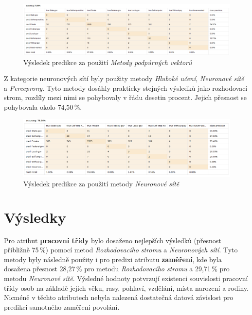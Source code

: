 \documentclass[11pt,a4paper,titlepage]{article}
\begin{document}
            \begin{figure}[H]
                \centering
                \includegraphics[width=1\textwidth]{./img/presnost_svm.png}
                \caption{Výsledek predikce za použití \textit{Metody podpůrných vektorů}}
            \end{figure}

            Z kategorie neuronových sítí byly použity metody \textit{Hluboké učení}, \textit{Neuronové sítě} a \textit{Perceprony}. Tyto metody dosáhly prakticky stejných výsledků jako rozhodovací strom, rozdíly mezi nimi se pohybovaly v řádu desetin procent. Jejich přesnost se pohybovala okolo 74,50\,\%.

            \begin{figure}[H]
                \centering
                \includegraphics[width=1\textwidth]{./img/presnost_neural.png}
                \caption{Výsledek predikce za použití metody \textit{Neuronové sítě}}
            \end{figure}

    \section{Výsledky}
        Pro atribut \textbf{pracovní třídy} bylo dosaženo nejlepších výsledků (přesnost přibližně 75\,\%) pomocí metod \textit{Rozhodovacího stromu} a \textit{Neuronových sítí}. Tyto metody byly následně použity i pro predixi atributu \textbf{zaměření}, kde byla dosažena přesnost 28,27\,\% pro metodu \textit{Rozhodovacího stromu} a 29,71\,\% pro metodu \textit{Neuronové sítě}. Výsledné hodnoty potvrzují existenci souvislosti pracovní třídy osob na základě jejich věku, rasy, pohlaví, vzdělání, místa narození a rodiny. Nicméně v těchto atributech nebyla nalezená dostatečná datová závislost pro predikci samotného zaměření povolání.
    
\end{document}
